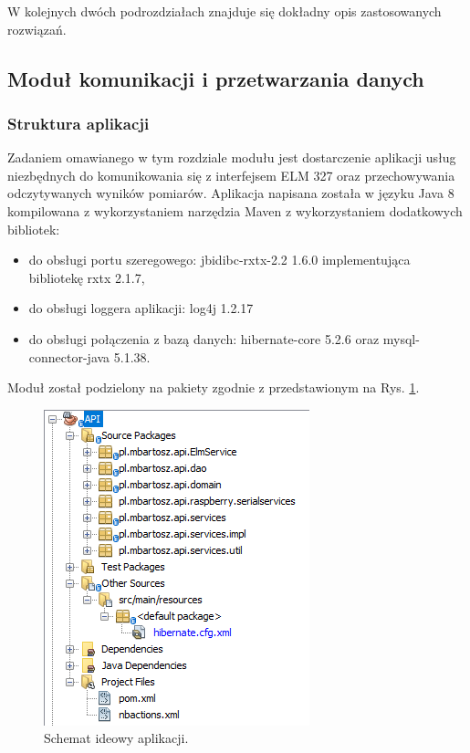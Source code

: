 \documentclass[12pt, twoside]{article} %
\numberwithin{equation}{subsection}
\numberwithin{figure}{section}
\numberwithin{table}{section}
\begin{document}
W kolejnych dwóch podrozdziałach znajduje się dokładny opis zastosowanych rozwiązań.

\newpage

	
\subsection{Moduł komunikacji i przetwarzania danych}\label{rozdzial_raspberry_software}
	\subsubsection{Struktura aplikacji}\label{rozdzial_pakiety_api}
	\hspace{0.5cm}Zadaniem omawianego w tym rozdziale modułu jest dostarczenie aplikacji usług niezbędnych do komunikowania się z interfejsem ELM 327 oraz przechowywania odczytywanych wyników pomiarów. Aplikacja napisana została w języku Java 8 kompilowana z wykorzystaniem narzędzia Maven z wykorzystaniem dodatkowych bibliotek:

	\begin{itemize}
		\item{do obsługi portu szeregowego: jbidibc-rxtx-2.2 1.6.0 implementująca bibliotekę rxtx 2.1.7,}
		\item{do obsługi loggera aplikacji: log4j 1.2.17}
		\item{do obsługi połączenia z bazą danych: hibernate-core 5.2.6 oraz mysql-connector-java 5.1.38.}
	\end{itemize}
	
	Moduł został podzielony na pakiety zgodnie z przedstawionym na Rys. \ref{rys_pakiety_api}.
	
		\begin{figure}[!h]
			\centering
			\includegraphics[scale=1]{Images/rys_pakiety_api.png}
			\caption{Schemat ideowy aplikacji.}
			\label{rys_pakiety_api}
		\end{figure}
		
\end{document}

